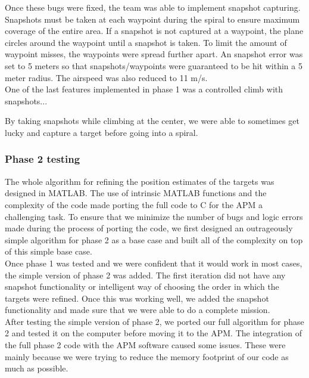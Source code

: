 \documentclass[11pt]{article}
\begin{document}
	Once these bugs were fixed, the team was able to implement snapshot capturing. Snapshots must be taken at each waypoint during the spiral to ensure maximum coverage of the entire area. If a snapshot is not captured at a waypoint, the plane circles around the waypoint until a snapshot is taken. To limit the amount of waypoint misses, the waypoints were spread further apart. An snapshot error was set to 5 meters so that snapshots/waypoints were guaranteed to be hit within a 5 meter radius. The airspeed was also reduced to 11 m/s.\\

	One of the last features implemented in phase 1 was a controlled climb with snapshots...


By taking snapshots while climbing at the center, we were able to sometimes get lucky and capture a target before going into a spiral.

\subsubsection{Phase 2 testing}
The whole algorithm for refining the position estimates of the targets was designed in MATLAB. The use of intrinsic MATLAB functions and the complexity of the code made porting the full code to C for the APM a challenging task. To ensure that we minimize the number of bugs and logic errors made during the process of porting the code, we first designed an outrageously simple algorithm for phase 2 as a base case and built all of the complexity on top of this simple base case. \\

Once phase 1 was tested and we were confident that it would work in most cases, the simple version of phase 2 was added. The first iteration did not have any snapshot functionality or intelligent way of choosing the order in which the targets were refined. Once this was working well, we added the snapshot functionality and made sure that we were able to do a complete mission. \\

After testing the simple version of phase 2, we ported our full algorithm for phase 2 and tested it on the computer before moving it to the APM. The integration of the full phase 2 code with the APM software caused some issues. These were mainly because we were trying to reduce the memory footprint of our code as much as possible. \\
\end{document}
